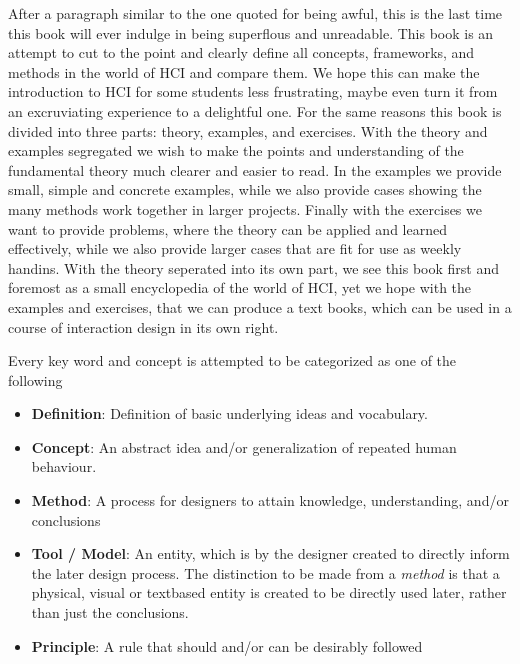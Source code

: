 After a paragraph similar to the one quoted for being awful, this is the last time this book will ever indulge in being superflous and unreadable. This book is an attempt to cut to the point and clearly define all concepts, frameworks, and methods in the world of HCI and compare them. We hope this can make the introduction to HCI for some students less frustrating, maybe even turn it from an excruviating experience to a delightful one. For the same reasons this book is divided into three parts: theory, examples, and exercises. With the theory and examples segregated we wish to make the points and understanding of the fundamental theory much clearer and easier to read. In the examples we provide small, simple and concrete examples, while we also provide cases showing the many methods work together in larger projects. Finally with the exercises we want to provide problems, where the theory can be applied and learned effectively, while we also provide larger cases that are fit for use as weekly handins. With the theory seperated into its own part, we see this book first and foremost as a small encyclopedia of the world of HCI, yet we hope with the examples and exercises, that we can produce a text books, which can be used in a course of interaction design in its own right.

Every key word and concept is attempted to be categorized as one of the following
\begin{itemize}
   \item \textbf{Definition}: Definition of basic underlying ideas and vocabulary.

   \item \textbf{Concept}: An abstract idea and/or generalization of repeated human behaviour.


   \item \textbf{Method}: A process for designers to attain knowledge, understanding, and/or conclusions

   \item \textbf{Tool / Model}: An entity, which is by the designer created to directly inform the later design process. The distinction to be made from a \emph{method} is that a physical, visual or textbased entity is created to be directly used later, rather than just the conclusions.

     \item \textbf{Principle}: A rule that should and/or can be desirably followed
\end{itemize}


